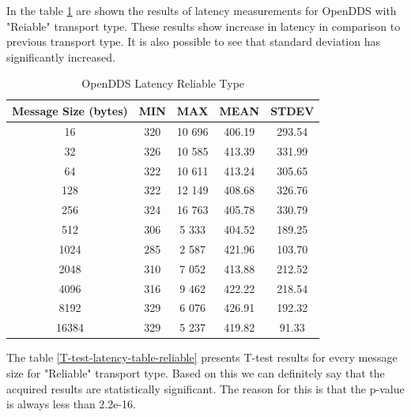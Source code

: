 \documentclass{csfourzero}
\begin{document}
In the table \ref{openDDS-latency-table-reliable} are shown the results of latency measurements for OpenDDS with "Reiable" transport type. These results show increase in latency in comparison to previous transport type. It is also possible to see that standard deviation has significantly increased.

\begin{table}[!ht]
	\centering
	\caption{OpenDDS Latency Reliable Type}
	\label{openDDS-latency-table-reliable}
	\begin{tabular}{|c|c|c|c|c|}
		\hline 
		Message Size (bytes)& MIN & MAX & MEAN & STDEV \\ 
		\hline 
		16 & 320 & 10 696 & 406.19 & 293.54 \\ 
		\hline 
		32 & 326 & 10 585 & 413.39 & 331.99 \\ 
		\hline 
		64 & 322 & 10 611 & 413.24 & 305.65 \\ 
		\hline 
		128 & 322 & 12 149 & 408.68 & 326.76 \\ 
		\hline 
		256 & 324 & 16 763 & 405.78 & 330.79 \\ 
		\hline 
		512 & 306 & 5 333 & 404.52 & 189.25 \\ 
		\hline 
		1024 & 285 & 2 587 & 421.96 & 103.70 \\ 
		\hline 
		2048 & 310 & 7 052 & 413.88 & 212.52 \\ 
		\hline 
		4096 & 316 & 9 462 & 422.22 & 218.54 \\ 
		\hline 
		8192 & 329 & 6 076 & 426.91 & 192.32 \\ 
		\hline 
		16384 & 329 & 5 237 & 419.82 & 91.33 \\ 
		\hline 
	\end{tabular}
\end{table}

The table \ref{T-test-latency-table-reliable} presents T-test results for every message size for "Reliable" transport type. Based on this we can definitely say that the acquired results are statistically significant. The reason for this is that the p-value is always less than 2.2e-16.
\end{document}
